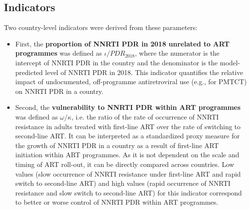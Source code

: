 \documentclass{article}
\begin{document}

\subsection{Indicators}

Two country-level indicators were derived from these parameters:
\begin{itemize}
	\item First, the \textbf{proportion of NNRTI PDR in 2018 unrelated to ART programmes} was defined as $\iota / PDR_{2018}$, where the numerator is the intercept of NNRTI PDR in the country and the denominator is the model-predicted level of NNRTI PDR in 2018. This indicator quantifies the relative impact of undocumented, off-programme antiretroviral use (e.g., for PMTCT) on NNRTI PDR in a country.
	
	\item Second, the \textbf{vulnerability to NNRTI PDR within ART programmes} was defined as $\omega/\kappa$, i.e. the ratio of the rate of occurrence of NNRTI resistance in adults treated with first-line ART over the rate of switching to second-line ART. It can be interpreted as a standardized proxy measure for the growth of NNRTI PDR in a country as a result of first-line ART initiation within ART programmes. As it is not dependent on the scale and timing of ART roll-out, it can be directly compared across countries. Low values (slow occurrence of NNRTI resistance under first-line ART and rapid switch to second-line ART) and high values (rapid occurrence of NNRTI resistance and slow switch to second-line ART) for this indicator correspond to better or worse control of NNRTI PDR within ART programmes.
\end{itemize}
\end{document}
